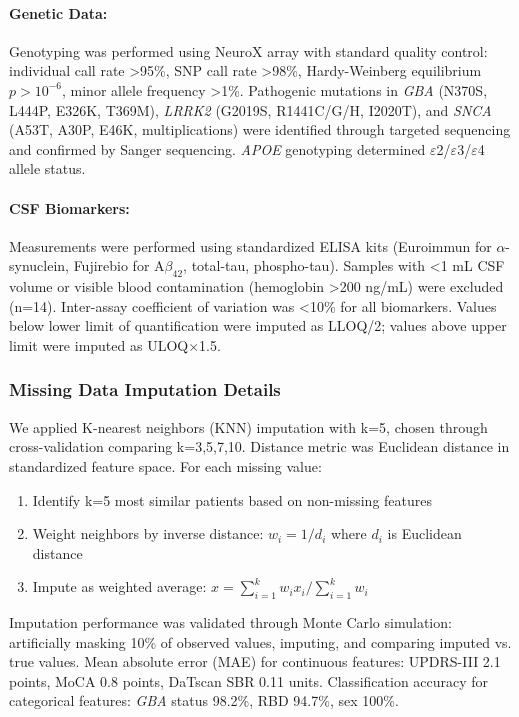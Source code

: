 \documentclass[11pt]{article}
\begin{document}
\paragraph{Genetic Data:} Genotyping was performed using NeuroX array with standard quality control: individual call rate >95\%, SNP call rate >98\%, Hardy-Weinberg equilibrium $p > 10^{-6}$, minor allele frequency >1\%. Pathogenic mutations in \textit{GBA} (N370S, L444P, E326K, T369M), \textit{LRRK2} (G2019S, R1441C/G/H, I2020T), and \textit{SNCA} (A53T, A30P, E46K, multiplications) were identified through targeted sequencing and confirmed by Sanger sequencing. \textit{APOE} genotyping determined $\varepsilon$2/$\varepsilon$3/$\varepsilon$4 allele status.

\paragraph{CSF Biomarkers:} Measurements were performed using standardized ELISA kits (Euroimmun for $\alpha$-synuclein, Fujirebio for A$\beta_{42}$, total-tau, phospho-tau). Samples with <1 mL CSF volume or visible blood contamination (hemoglobin >200 ng/mL) were excluded (n=14). Inter-assay coefficient of variation was <10\% for all biomarkers. Values below lower limit of quantification were imputed as LLOQ/2; values above upper limit were imputed as ULOQ$\times$1.5.

\subsubsection{Missing Data Imputation Details}
We applied K-nearest neighbors (KNN) imputation with k=5, chosen through cross-validation comparing k=3,5,7,10. Distance metric was Euclidean distance in standardized feature space. For each missing value:
\begin{enumerate}
    \item Identify k=5 most similar patients based on non-missing features
    \item Weight neighbors by inverse distance: $w_i = 1/d_i$ where $d_i$ is Euclidean distance
    \item Impute as weighted average: $\hat{x} = \sum_{i=1}^k w_i x_i / \sum_{i=1}^k w_i$
\end{enumerate}

Imputation performance was validated through Monte Carlo simulation: artificially masking 10\% of observed values, imputing, and comparing imputed vs. true values. Mean absolute error (MAE) for continuous features: UPDRS-III 2.1 points, MoCA 0.8 points, DaTscan SBR 0.11 units. Classification accuracy for categorical features: \textit{GBA} status 98.2\%, RBD 94.7\%, sex 100\%.
\end{document}
